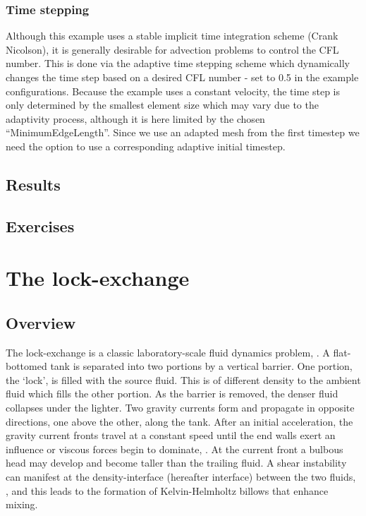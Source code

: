 \subsubsection{Time stepping}
Although this example uses a stable implicit time integration scheme (Crank Nicolson),
it is generally desirable for advection problems to control the CFL number. This is done
via the adaptive time stepping scheme which dynamically changes the time 
step based on a desired CFL number - set to 0.5 in the example configurations. Because the 
example uses a constant velocity, the time step is only determined by the smallest 
element size which may vary due to the adaptivity process, although it is here
limited by the chosen ``MinimumEdgeLength''. Since we use an adapted mesh from the first 
timestep we need the option  to use a corresponding 
adaptive initial timestep.

\subsection{Results}
\subsection{Exercises}



\section{The lock-exchange}
\label{sect:lock_exchange}
\subsection{Overview}
\label{sect:lock_exchange_overview}

The lock-exchange is a classic laboratory-scale fluid dynamics problem, \citep{fannelop_94, huppert_06, simpson_87}. A flat-bottomed tank is separated into two portions by a vertical barrier. One portion, the `lock', is filled with the source fluid. This is of different density to the ambient fluid which fills the other portion. As the barrier is removed, the denser fluid collapses under the lighter. Two gravity currents form and propagate in opposite directions, one above the other, along the tank. After an initial acceleration, the gravity current fronts travel at a constant speed until the end walls exert an influence or viscous forces begin to dominate, \citep{cantero_07, hartel_99, huppert_80}. At the current front a bulbous head may develop and become taller than the trailing fluid. A shear instability can manifest at the density-interface (hereafter interface) between the two fluids, \citep{turner_73}, and this leads to the formation of Kelvin-Helmholtz billows that enhance mixing.

